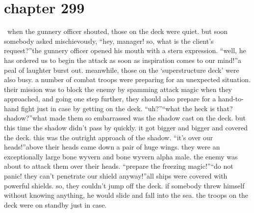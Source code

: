 \section{chapter 299}






 when the gunnery officer shouted, those on the deck were quiet.
but soon somebody asked mischievously, “hey, manager! so, what is the client’s request?”the gunnery officer opened his mouth with a stern expression.
“well, he has ordered us to begin the attack as soon as inspiration comes to our mind!”a peal of laughter burst out.
meanwhile, those on the ‘superstructure deck’ were also busy.
 a number of combat troops were preparing for an unexpected situation.
 their mission was to block the enemy by spamming attack magic when they approached, and going one step further, they should also prepare for a hand-to-hand fight just in case by getting on the deck.
“uh?”“what the heck is that? shadow?”what made them so embarrassed was the shadow cast on the deck.
but this time the shadow didn’t pass by quickly.
 it got bigger and bigger and covered the deck.
this was the outright approach of the shadow.
“it’s over our heads!”above their heads came down a pair of huge wings.
 they were an exceptionally large bone wyvern and bone wyvern alpha male.
 the enemy was about to attack them over their heads.
“prepare the freezing magic!”“do not panic! they can’t penetrate our shield anyway!”all ships were covered with powerful shields.
 so, they couldn’t jump off the deck.
 if somebody threw himself without knowing anything, he would slide and fall into the sea.
the troops on the deck were on standby just in case.

